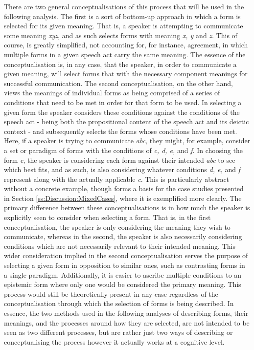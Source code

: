 There are two general conceptualisations of this process that will be used in the following analysis. The first is a sort of bottom-up approach in which a form is selected for its given meaning. That is, a speaker is attempting to communicate some meaning \textit{xyz}, and as such selects forms with meaning \textit{x, y} and \textit{z}. This of course, is greatly simplified, not accounting for, for instance, agreement, in which multiple forms in a given speech act carry the same meaning. The essence of the conceptualisation is, in any case, that the speaker, in order to communicate a given meaning, will select forms that with the necessary component meanings for successful communication. The second conceptualisation, on the other hand, views the meanings of individual forms as being comprised of a series of conditions that need to be met in order for that form to be used. In selecting a given form the speaker considers these conditions against the conditions of the speech act - being both the propositional content of the speech act and its deictic context - and subsequently selects the forms whose conditions have been met. Here, if a speaker is trying to communicate \textit{abc}, they might, for example, consider a set or paradigm of forms with the conditions of \textit{c, d, e,} and \textit{f}. In choosing the form \textit{c}, the speaker is considering each form against their intended \textit{abc} to see which best fits, and as such, is also considering whatever conditions \textit{d, e,} and \textit{f} represent along with the actually applicable \textit{c}. This is particularly abstract without a concrete example, though forms a basis for the case studies presented in Section \ref{ss:Discussion:MixedCases}, where it is exemplified more clearly. The primary difference between these conceptualisations is in how much the speaker is explicitly seen to consider when selecting a form. That is, in the first conceptualisation, the speaker is only considering the meaning they wish to communicate, whereas in the second, the speaker is also necessarily considering conditions which are not necessarily relevant to their intended meaning. This wider consideration implied in the second conceptualisation serves the purpose of selecting a given form in opposition to similar ones, such as contrasting forms in a single paradigm. Additionally, it is easier to ascribe multiple conditions to an epistemic form where only one would be considered the primary meaning. This process would still be theoretically present in any case regardless of the conceptualisation through which the selection of forms is being described. In essence, the two methods used in the following analyses of describing forms, their meanings, and the processes around how they are selected, are not intended to be seen as two different processes, but are rather just two ways of describing or conceptualising the process however it actually works at a cognitive level.